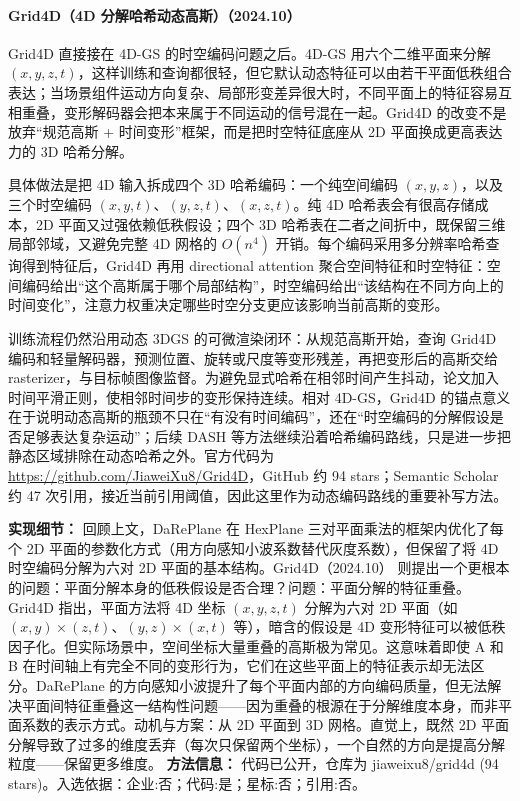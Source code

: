 \paragraph{Grid4D（4D 分解哈希动态高斯）（2024.10）\cite{2410_20815}}
Grid4D 直接接在 4D-GS 的时空编码问题之后。4D-GS 用六个二维平面来分解 $(x,y,z,t)$，这样训练和查询都很轻，但它默认动态特征可以由若干平面低秩组合表达；当场景组件运动方向复杂、局部形变差异很大时，不同平面上的特征容易互相重叠，变形解码器会把本来属于不同运动的信号混在一起。Grid4D 的改变不是放弃“规范高斯 + 时间变形”框架，而是把时空特征底座从 2D 平面换成更高表达力的 3D 哈希分解。

具体做法是把 4D 输入拆成四个 3D 哈希编码：一个纯空间编码 $(x,y,z)$，以及三个时空编码 $(x,y,t)$、$(y,z,t)$、$(x,z,t)$。纯 4D 哈希表会有很高存储成本，2D 平面又过强依赖低秩假设；四个 3D 哈希表在二者之间折中，既保留三维局部邻域，又避免完整 4D 网格的 $O(n^4)$ 开销。每个编码采用多分辨率哈希查询得到特征后，Grid4D 再用 directional attention 聚合空间特征和时空特征：空间编码给出“这个高斯属于哪个局部结构”，时空编码给出“该结构在不同方向上的时间变化”，注意力权重决定哪些时空分支更应该影响当前高斯的变形。

训练流程仍然沿用动态 3DGS 的可微渲染闭环：从规范高斯开始，查询 Grid4D 编码和轻量解码器，预测位置、旋转或尺度等变形残差，再把变形后的高斯交给 rasterizer，与目标帧图像监督。为避免显式哈希在相邻时间产生抖动，论文加入时间平滑正则，使相邻时间步的变形保持连续。相对 4D-GS，Grid4D 的锚点意义在于说明动态高斯的瓶颈不只在“有没有时间编码”，还在“时空编码的分解假设是否足够表达复杂运动”；后续 DASH 等方法继续沿着哈希编码路线，只是进一步把静态区域排除在动态哈希之外。官方代码为 \url{https://github.com/JiaweiXu8/Grid4D}，GitHub 约 94 stars；Semantic Scholar 约 47 次引用，接近当前引用阈值，因此这里作为动态编码路线的重要补写方法。

\textbf{实现细节：} 回顾上文，DaRePlane 在 HexPlane 三对平面乘法的框架内优化了每个 2D 平面的参数化方式（用方向感知小波系数替代灰度系数），但保留了将 4D 时空编码分解为六对 2D 平面的基本结构。Grid4D（2024.10） 则提出一个更根本的问题：平面分解本身的低秩假设是否合理？问题：平面分解的特征重叠。Grid4D 指出，平面方法将 4D 坐标 $(x,y,z,t)$ 分解为六对 2D 平面（如 $(x,y)\times(z,t)$、$(y,z)\times(x,t)$ 等），暗含的假设是 4D 变形特征可以被低秩因子化。但实际场景中，空间坐标大量重叠的高斯极为常见。这意味着即使 A 和 B 在时间轴上有完全不同的变形行为，它们在这些平面上的特征表示却无法区分。DaRePlane 的方向感知小波提升了每个平面内部的方向编码质量，但无法解决平面间特征重叠这一结构性问题——因为重叠的根源在于分解维度本身，而非平面系数的表示方式。动机与方案：从 2D 平面到 3D 网格。直觉上，既然 2D 平面分解导致了过多的维度丢弃（每次只保留两个坐标），一个自然的方向是提高分解粒度——保留更多维度。
\textbf{方法信息：} 代码已公开，仓库为 jiaweixu8/grid4d (94 stars)。入选依据：企业:否；代码:是；星标:否；引用:否。


